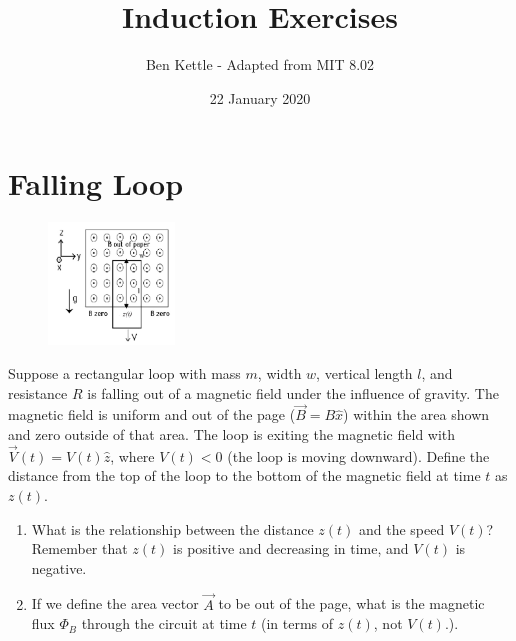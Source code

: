 \documentclass[a4paper]{article}
\title{Induction Exercises}
\author{Ben Kettle - Adapted from MIT 8.02}
\date{22 January 2020}
\begin{document}
\maketitle

\section{Falling Loop}

\begin{figure}
  \begin{center}
    \includegraphics[width=0.3\textwidth,trim={0 5mm 0 10mm}, clip]{ex1fig.png}
  \end{center}
\end{figure}

Suppose a rectangular loop with mass $m$, width $w$, vertical length $l$, and resistance $R$ is falling out of a magnetic field under the influence of gravity. The magnetic field is uniform and out of the page ($\vec{B} = B\hat{x}$) within the area shown and zero outside of that area. The loop is exiting the magnetic field with $\vec{V}(t) = V(t)\hat{z}$, where $V(t) < 0$ (the loop is moving downward). Define the distance from the top of the loop to the bottom of the magnetic field at time $t$ as $z(t)$.

\begin{enumerate}[label=(\alph*), itemsep=9.8mm]
    \item What is the relationship between the distance $z(t)$ and the speed $V(t)$? Remember that $z(t)$ is positive and decreasing in time, and $V(t)$ is negative.
    \item If we define the area vector $\vec{A}$ to be out of the page, what is the magnetic flux $\Phi_B$ through the circuit at time $t$ (in terms of $z(t)$, not $V(t)$.).
\end{enumerate}
\end{document}
